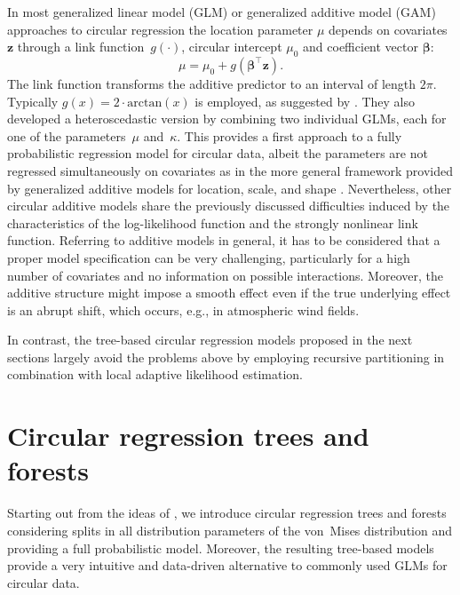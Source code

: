 \documentclass[nojss,shortnames]{jss}
\numberwithin{equation}{section}
\begin{document}
In most generalized linear model (GLM) or generalized additive model (GAM)
approaches to circular regression the location parameter $\mu$ depends on
covariates $\mathbf{z}$ through a link function~$g(\cdot)$, circular intercept
$\mu_0$ and coefficient vector $\mathbf{\beta}$: \begin{equation} \mu = \mu_0 +
g\left(\mathbf{\beta}^{\top} \mathbf{z}\right). \end{equation} The link
function transforms the additive predictor to an interval of length $2\pi$.
Typically $g(x) = 2\cdot \text{arctan}(x)$ is employed, as suggested by
\citet{Fisher+Lee:1992}. They also developed a heteroscedastic version by
combining two individual GLMs, each for one of the parameters~$\mu$ and~$\kappa$. 
This provides a first approach to a fully probabilistic regression
model for circular data, albeit the parameters are not regressed simultaneously
on covariates as in the more general framework provided by generalized additive
models for location, scale, and shape \citep[GAMLSS,
][]{Rigby+Stasinopoulos:2005}. Nevertheless, other circular additive models
share the previously discussed difficulties induced by the characteristics of
the log-likelihood function and the strongly nonlinear link function. Referring
to additive models in general, it has to be considered that a proper model
specification can be very challenging, particularly for a high number of
covariates and no information on possible interactions. Moreover, the additive
structure might impose a smooth effect even if the true underlying effect is an
abrupt shift, which occurs, e.g., in atmospheric wind fields.

In contrast, the tree-based circular regression models proposed in the next
sections largely avoid the problems above by employing recursive partitioning
in combination with local adaptive likelihood estimation.


\section{Circular regression trees and forests}
\label{sec:tree_forest}

Starting out from the ideas of \citet{Lund:2002}, we introduce circular
regression trees and forests considering splits in all distribution parameters
of the von~Mises distribution and providing a full probabilistic model.
Moreover, the resulting tree-based models provide a very intuitive and
data-driven alternative to commonly used GLMs for circular data.
\end{document}
